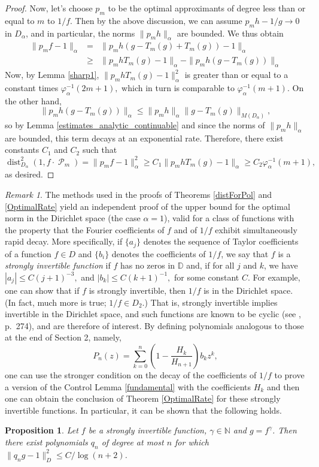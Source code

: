 \documentclass[11 pt,reqno]{amsart}
\newtheorem{prop}[thm]{Proposition}
\theoremstyle{definition}
\theoremstyle{remark}
\newtheorem{rem}[thm]{Remark}
\numberwithin{equation}{section} \numberwithin{figure}{section}
\newcommand{\DD}{{\mathbb D}}
\newcommand{\NN}{{\mathbb N}}
\DeclareMathOperator{\Pol}{{\mathcal P}}
\DeclareMathOperator{\dist}{dist}
\begin{document}
\begin{proof}
Now, let's choose $p_m$ to be the optimal approximants of degree less
than or equal to $m$ to $1/f$.  Then by the above discussion, we can
assume $p_m h - 1/g \rightarrow 0$ in $D_{\alpha}$, and in
particular, the norms $\|p_m h \|_{\alpha}$ are bounded. We thus
obtain
\begin{eqnarray*}
     \|p_m f - 1 \|_{\alpha}&  = &  \| p_m h (g - T_m(g)+T_m(g)) - 1\|_{\alpha} \\
     & \geq & \| p_m h T_m(g) - 1\|_{\alpha} - \| p_m h (g - T_m(g))\|_{\alpha}
\end{eqnarray*}
Now, by Lemma \ref{sharp1},
$ \| p_m h T_m(g) - 1\|_{\alpha}^2$ is greater than or equal to a constant times  $\varphi^{-1}_{\alpha}(2m+1), $
which in turn is comparable to $ \varphi^{-1}_{\alpha}(m+1).$ On the other hand,
$$ \| p_m h (g - T_m(g))\|_{\alpha}  \leq \|p_mh\|_{\alpha}\|g - T_m(g)\|_{M(D_{\alpha})},$$ so
by Lemma \ref{estimates_analytic_continuable} and since the norms of $\|p_m h \|_{\alpha}$ are bounded,
this term decays at an exponential rate.  Therefore, there exist constants $C_1$ and $C_2$ such that
$$ \dist_{D_{\alpha}}^{2}(1,f\cdot\Pol_{m}) = \|p_m f - 1 \|_{\alpha}^2 \geq C_1 \| p_m h T_m(g) - 1\|_{\alpha} \geq C_2  \varphi^{-1}_{\alpha}(m+1),$$ as desired.
\end{proof}

\begin{rem}

The methods used in the proofs of Theorems \ref{distForPol} and \ref{OptimalRate}
yield an independent proof of the upper bound for the optimal norm
in the Dirichlet space (the case $\alpha=1$), valid for a class of
functions with the property that the Fourier coefficients of $f$ and
of $1/f$ exhibit simultaneously rapid decay. More specifically, if
$\{a_j\}$ denotes the sequence of Taylor coefficients of a
function $f \in D$ and $\{b_i\}$ denotes the coefficients of
$1/f$, we say that $f$ is a \emph{strongly invertible function} if
$f$ has no zeros in $\DD$ and, if for all $j$ and $k$, we have
$|a_j| \leq C(j+1)^{-3},$ and $|b_k| \leq C(k+1)^{-1},$ for some constant $C$.
For example, one can show that if $f$ is strongly
invertible, then $1/f$ is in the Dirichlet space.
(In fact, much more is true; $1/f \in D_2$.)
That is, strongly invertible implies invertible in
the Dirichlet space, and such functions are known to be cyclic (see
\cite{BS84}, p.~274), and are therefore of interest.
By defining polynomials analogous to those at the end of Section 2, namely,
\[P_n(z)=
\sum_{k=0}^n \left(1-\frac{H_{k}}{H_{n+1}}\right)b_k z^k,\]
one can use the stronger condition on the decay of the coefficients of $1/f$ to prove
a version of the Control Lemma \ref{fundamental} with the coefficients
$H_k$ and then one can obtain the conclusion of Theorem \ref{OptimalRate} for these
strongly invertible functions.  In particular, it can be shown that the
following holds.
\begin{prop}
Let $f$ be a strongly invertible function, $\gamma \in \NN$ and
$g=f^\gamma$. Then there exist polynomials $q_n$ of degree at most $n$ for
which $\|q_n g -1 \|^2_D \leq C/\log (n+2)$.
\end{prop}
\end{rem}
\end{document}
